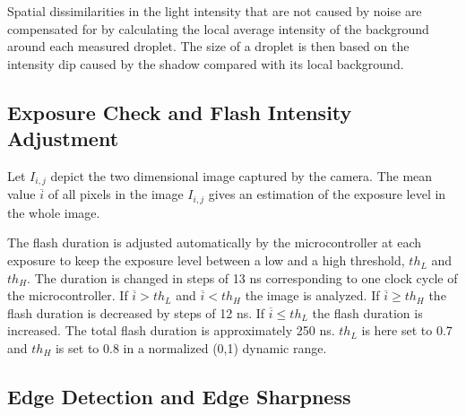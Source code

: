 Spatial dissimilarities in the light intensity that are not caused by noise are compensated for by calculating the local average intensity of the background around each measured droplet. The size of a droplet is then based on the intensity dip caused by the shadow compared with its local background.

\subsection{Exposure Check and Flash Intensity Adjustment}

Let $I_{i,j}$ depict the two dimensional image captured by the camera. The mean value $\overline{i}$ of all pixels in the image $I_{i,j}$ gives an estimation of the exposure level in the whole image. 

The flash duration is adjusted automatically by the microcontroller at each exposure to keep the exposure level between a low and a high threshold, $th_L$ and $th_H$. The duration is changed in steps of 13 ns corresponding to one clock cycle of the microcontroller. If $\overline{i} > th_L$ and $\overline{i} < th_H$ the image is analyzed. If $\overline{i} \geq th_H$ the flash duration is decreased by steps of 12 ns. If $\overline{i} \leq th_L$ the flash duration is increased. The total flash duration is approximately 250 ns. $th_L$ is here set to 0.7 and $th_H$ is set to 0.8 in a normalized (0,1) dynamic range.

\subsection{Edge Detection and Edge Sharpness}

